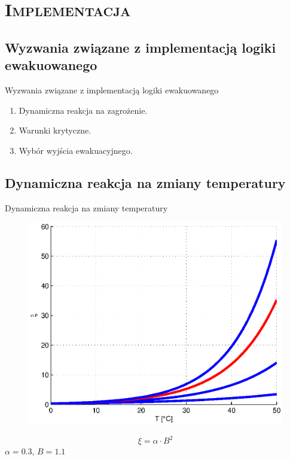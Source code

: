 \section{\scshape Implementacja}


\subsection{Wyzwania związane z implementacją logiki ewakuowanego}
\begin{frame}{Wyzwania związane z implementacją logiki ewakuowanego}
  \begin{enumerate}
    \item Dynamiczna reakcja na zagrożenie.
    \item Warunki krytyczne.
    \item Wybór wyjścia ewakuacyjnego.
  \end{enumerate}
\end{frame}


\subsection{Dynamiczna reakcja na zmiany temperatury}
\begin{frame}{Dynamiczna reakcja na zmiany temperatury}
  \begin{figure}
    \centering
    \includegraphics[height=0.6\textheight]{wykresy-kuba}
  \end{figure}
  $$\xi = \alpha \cdot B^2$$
  $\alpha = 0.3$, $B = 1.1$
\end{frame}

